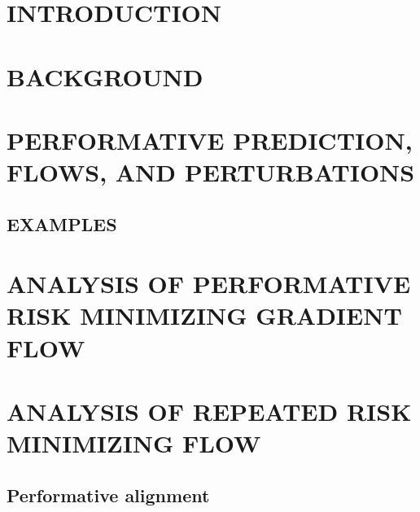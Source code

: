 \documentclass[twoside]{article}
\begin{document}

\section{INTRODUCTION}
\label{sec:intro}



\section{BACKGROUND}
\label{sec:background}



\section{PERFORMATIVE PREDICTION, FLOWS, AND PERTURBATIONS}
\label{sec:model}



\subsection{EXAMPLES}
\label{sec:example}



\section{ANALYSIS OF PERFORMATIVE RISK MINIMIZING GRADIENT FLOW}
\label{sec:analysis_prm}



\section{ANALYSIS OF REPEATED RISK MINIMIZING FLOW}
\label{sec:analysis_RGD}



\subsection{Performative alignment}

\end{document}
